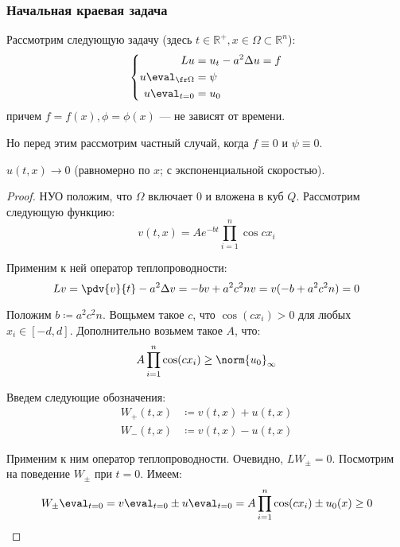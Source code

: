 \subsubsection{Начальная краевая задача}

Рассмотрим следующую задачу (здесь $t \in \mathbb{R}^+, x \in \Omega \subset \mathbb{R}^n$):
\begin{equation}
  \left\{\begin{aligned}
    Lu &= u_t - a^2 \Delta u = f \\
    u \eval_{\fr \Omega} &= \psi \\
    u \eval_{t = 0} &= u_0
  \end{aligned}\right.
\end{equation}
причем $f = f(x), \phi = \phi(x)$ --- не зависят от времени.

Но перед этим рассмотрим частный случай, когда $f \equiv 0$ и $\psi \equiv 0$.

\begin{thm}
  $u(t, x) \to 0$ (равномерно по $x$; с экспоненциальной скоростью).
\end{thm}

\begin{proof}
  НУО положим, что $\Omega$ включает $0$ и вложена в куб $Q$. Рассмотрим следующую функцию:
  \begin{equation}
    v(t, x) = Ae^{-bt} \prod_{i=1}^n \cos cx_i
  \end{equation}
  
  Применим к ней оператор теплопроводности:
  \begin{equation}
    Lv = \pdv{v}{t} - a^2 \Delta v = -bv + a^2 c^2 nv = v(-b + a^2 c^2 n) = 0
  \end{equation}
  
  Положим $\boxed{b \coloneqq a^2 c^2 n}$. Вощьмем такое $c$, что $\cos(cx_i) > 0$ для любых $x_i \in [-d, d]$. Дополнительно возьмем такое $A$, что:
  \begin{equation}
    A \prod_{i=1}^n \cos(cx_i) \ge \norm{u_0}_\infty
  \end{equation}
  
  Введем следующие обозначения:
  \begin{align}
    W_+(t, x) &\coloneqq v(t, x) + u(t, x) \\
    W_-(t, x) &\coloneqq v(t, x) - u(t, x)
  \end{align}
  
  Применим к ним оператор теплопроводности. Очевидно, $LW_\pm = 0$. Посмотрим на поведение $W_\pm$ при $t = 0$. Имеем:
  \begin{equation}
    W_\pm \eval_{t = 0} = v \eval_{t = 0} \pm u \eval_{t = 0} = A \prod_{i=1}^n \cos(cx_i) \pm u_0(x) \ge 0
  \end{equation}
  
\end{proof}

